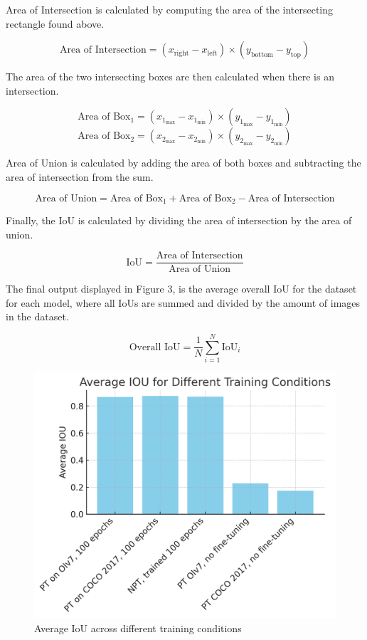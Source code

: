 \documentclass[10pt,twocolumn,letterpaper]{article}
\begin{document}
Area of Intersection is calculated by computing the area of the intersecting rectangle found above.

\[
\text{Area of Intersection} = (x_{\text{right}} - x_{\text{left}}) \times (y_{\text{bottom}} - y_{\text{top}})
\]

The area of the two intersecting boxes are then calculated when there is an intersection.

\[
\text{Area of Box}_1 = (x_{1_{\text{max}}} - x_{1_{\text{min}}}) \times (y_{1_{\text{max}}} - y_{1_{\text{min}}})
\]
\[
\text{Area of Box}_2 = (x_{2_{\text{max}}} - x_{2_{\text{min}}}) \times (y_{2_{\text{max}}} - y_{2_{\text{min}}})
\]

Area of Union is calculated by adding the area of both boxes and subtracting the area of intersection from the sum.

\[
\text{Area of Union} = \text{Area of Box}_1 + \text{Area of Box}_2 - \text{Area of Intersection}
\]

Finally, the IoU is calculated by dividing the area of intersection by the area of union.

\[
\text{IoU} = \frac{\text{Area of Intersection}}{\text{Area of Union}}
\]

The final output displayed in Figure 3, is the average overall IoU for the dataset for each model, where all IoUs are summed and divided by the amount of images in the dataset.

\[
\text{Overall IoU} = \frac{1}{N} \sum_{i=1}^{N} \text{IoU}_i
\]

\begin{figure}[H]
    \centering
    \includegraphics[width=0.8\linewidth]{iou.png}
    \caption{Average IoU across different training conditions}
    \label{fig:iou}
\end{figure}
\end{document}
